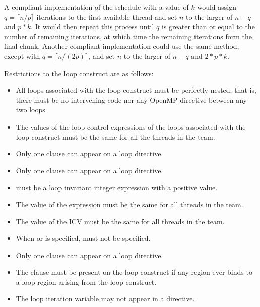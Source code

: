 A compliant implementation of the  schedule with a  value of $k$ 
would assign $q = \lceil n/p \rceil$ iterations to the first available thread and set $n$ to the larger of 
$n-q$ and $p*k$. It would then repeat this process until $q$ is greater than or equal to the 
number of remaining iterations, at which time the remaining iterations form the final 
chunk. Another compliant implementation could use the same method, except with 
$q = \lceil n/(2p) \rceil$, and set $n$ to the larger of $n-q$ and $2*p*k$. 
\noteend

\restrictions
Restrictions to the loop construct are as follows:

\begin{itemize}
\item All loops associated with the loop construct must be perfectly nested; that is, there 
must be no intervening code nor any OpenMP directive between any two loops.

\item The values of the loop control expressions of the loops associated with the loop 
construct must be the same for all the threads in the team.

\item Only one  clause can appear on a loop directive.

\item Only one  clause can appear on a loop directive.

\item {} must be a loop invariant integer expression with a positive value.

\item The value of the  expression must be the same for all threads in the team.

\item The value of the  ICV must be the same for all threads in the team.

\item When  or  is specified,  must 
not be specified.

\item Only one  clause can appear on a loop directive.

\item The  clause must be present on the loop construct if any  region 
ever binds to a loop region arising from the loop construct.

\item The loop iteration variable may not appear in a  directive.
\end{itemize}

